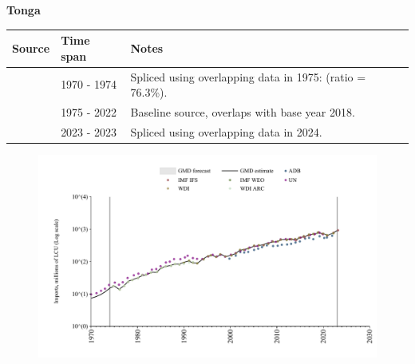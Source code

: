 \documentclass[12pt,a4paper,landscape]{article}
\begin{document}
\begin{adjustbox}{max totalsize={\paperwidth}{\paperheight},center}
\begin{minipage}[t][\textheight][t]{\textwidth}
\vspace*{0.5cm}
{}
\begin{center}
{\Large\bfseries Tonga}
\end{center}
\vspace{0.5cm}
\begin{table}[H]
\centering
\small
\begin{tabular}{|l|l|l|}
\hline
\textbf{Source} & \textbf{Time span} & \textbf{Notes} \\
\hline
\rowcolor{white}\cite{UN}& 1970 - 1974 &Spliced using overlapping data in 1975: (ratio = 76.3\%).\\
\rowcolor{lightgray}\cite{WDI}& 1975 - 2022 &Baseline source, overlaps with base year 2018.\\
\rowcolor{white}\cite{IMF_IFS}& 2023 - 2023 &Spliced using overlapping data in 2024.\\
\hline
\end{tabular}
\end{table}
\begin{figure}[H]
\centering
\includegraphics[width=\textwidth,height=0.6\textheight,keepaspectratio]{graphs/TON_imports.pdf}
\end{figure}
\end{minipage}
\end{adjustbox}
\end{document}
